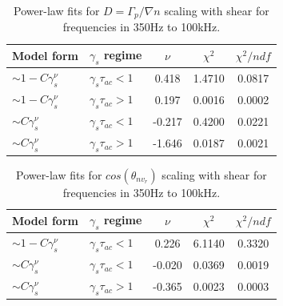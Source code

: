 \documentclass[aip,pop,amsmath,amssymb,peprint,superscriptaddress]{revtex4-1} %
\begin{document}
\begin{table}
\caption{\label{tab:table4}Power-law fits for $D = \Gamma_{p}/\nabla{n}$ scaling with shear for frequencies in 350Hz to 100kHz.}
\begin{ruledtabular}
\begin{tabular}{llccc}
Model form&$\gamma_{s}$ regime&$\nu$&$\chi^2$&$\chi^2/ndf$\\
\hline
$\sim 1-C\gamma_{s}^\nu$&$\gamma_{s}\tau_{ac}<1$ &0.418   &1.4710    &0.0817\\
$\sim 1-C\gamma_{s}^\nu$&$\gamma_{s}\tau_{ac}>1$ &0.197   &0.0016    &0.0002\\
$\sim C\gamma_{s}^\nu$&$\gamma_{s}\tau_{ac}<1$   &-0.217  &0.4200    &0.0221\\
$\sim C\gamma_{s}^\nu$&$\gamma_{s}\tau_{ac}>1$   &-1.646  &0.0187    &0.0021\\
\end{tabular}
\end{ruledtabular}
\end{table}

\begin{table}
\caption{\label{tab:table5}Power-law fits for $cos(\theta_{nv_{r}})$ scaling with shear for frequencies in 350Hz to 100kHz.}
\begin{ruledtabular}
\begin{tabular}{llccc}
Model form&$\gamma_{s}$ regime&$\nu$&$\chi^2$&$\chi^2/ndf$\\
\hline
$\sim 1-C\gamma_{s}^\nu$&$\gamma_{s}\tau_{ac}<1$ &0.226   &6.1140    &0.3320\\
$\sim C\gamma_{s}^\nu$&$\gamma_{s}\tau_{ac}<1$   &-0.020  &0.0369    &0.0019\\
$\sim C\gamma_{s}^\nu$&$\gamma_{s}\tau_{ac}>1$   &-0.365  &0.0023    &0.0003\\
\end{tabular}
\end{ruledtabular}
\end{table}
\end{document}
